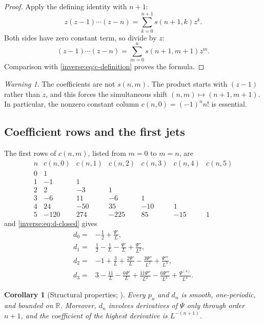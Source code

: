 \documentclass[11pt,oneside]{article}
\newtheorem{corollary}[theorem]{Corollary}
\theoremstyle{definition}
\theoremstyle{remark}
\newtheorem{warning}[theorem]{Warning}
\newcommand{\R}{\mathbb R}
\begin{document}
\begin{proof}
Apply the defining identity with $n+1$:
\[
 z(z-1)\cdots(z-n)
 =\sum_{k=0}^{n+1}s(n+1,k)z^k.
\]
Both sides have zero constant term, so divide by $z$:
\[
 (z-1)\cdots(z-n)
 =\sum_{m=0}^n s(n+1,m+1)z^m.
\]
Comparison with \eqref{inverse:eq:c-definition} proves the formula.
\end{proof}

\begin{warning}
The coefficients are not $s(n,m)$.  The product starts with $(z-1)$
rather than $z$, and this forces the simultaneous shift
$(n,m)\mapsto(n+1,m+1)$.  In particular, the nonzero constant column
$c(n,0)=(-1)^nn!$ is essential.
\end{warning}

\subsection{Coefficient rows and the first jets}

The first rows of $c(n,m)$, listed from $m=0$ to $m=n$, are
\[
\begin{array}{c|rrrrrr}
n&c(n,0)&c(n,1)&c(n,2)&c(n,3)&c(n,4)&c(n,5)\\
\hline
0&1\\
1&-1&1\\
2&2&-3&1\\
3&-6&11&-6&1\\
4&24&-50&35&-10&1\\
5&-120&274&-225&85&-15&1
\end{array}
\]
and \eqref{inverse:eq:d-closed} gives
\begin{align}
 d_0={}&-\frac12+\frac{\Psi'}L, \label{inverse:eq:d0-explicit}\\
 d_1={}&\frac12-\frac1L-\frac{\Psi'}L+\frac{\Psi''}{L^2},
 \label{inverse:eq:d1-explicit}\\
 d_2={}&-1+\frac3L+\frac{2\Psi'}L
       -\frac{3\Psi''}{L^2}+\frac{\Psi'''}{L^3},
 \label{inverse:eq:d2-explicit}\\
 d_3={}&3-\frac{11}{L}-\frac{6\Psi'}L
       +\frac{11\Psi''}{L^2}-\frac{6\Psi'''}{L^3}
       +\frac{\Psi^{(4)}}{L^4}. \label{inverse:eq:d3-explicit}
\end{align}

\begin{corollary}[Structural properties; \Formalized]
\label{inverse:cor:jet-structure}
Every $p_n$ and $d_n$ is smooth, one-periodic, and bounded on $\R$.
Moreover, $d_n$ involves derivatives of $\Psi$ only through order $n+1$,
and the coefficient of the highest derivative is $L^{-(n+1)}$.
\end{corollary}
\end{document}
